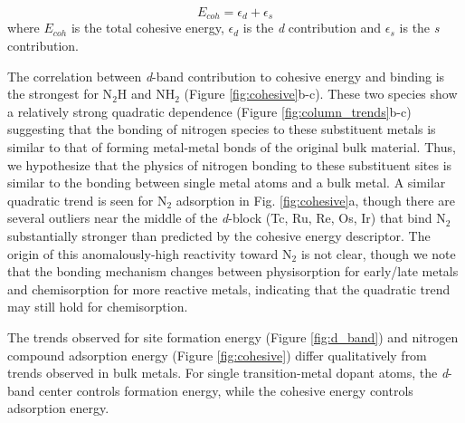 \begin{equation}
    E_{coh} = \epsilon_d + \epsilon_s
    \label{eq:cohesive}
\end{equation}
where $E_{coh}$ is the total cohesive energy, $\epsilon_d$ is the \textit{d} contribution and $\epsilon_s$ is the \textit{s} contribution.


The correlation between \textit{d}-band contribution to cohesive energy and binding is the strongest for N$_2$H and NH$_2$ (Figure \ref{fig:cohesive}b-c). These two species show a relatively strong quadratic dependence (Figure \ref{fig:column_trends}b-c) suggesting that the bonding of nitrogen species to these substituent metals is similar to that of forming metal-metal bonds of the original bulk material. Thus, we hypothesize that the physics of nitrogen bonding to these substituent sites is similar to the bonding between single metal atoms and a bulk metal.
A similar quadratic trend is seen for N$_2$ adsorption in Fig. \ref{fig:cohesive}a, though there are several outliers near the middle of the \textit{d}-block (Tc, Ru, Re, Os, Ir) that bind N$_2$ substantially stronger than predicted by the cohesive energy descriptor. The origin of this anomalously-high reactivity toward N$_2$ is not clear, though we note that the bonding mechanism changes between physisorption for early/late metals and chemisorption for more reactive metals, indicating that the quadratic trend may still hold for chemisorption.

The trends observed for site formation energy (Figure \ref{fig:d_band}) and nitrogen compound adsorption energy (Figure \ref{fig:cohesive}) differ qualitatively from trends observed in bulk metals. For single transition-metal dopant atoms, the \textit{d}-band center controls formation energy, while the cohesive energy controls adsorption energy. 


